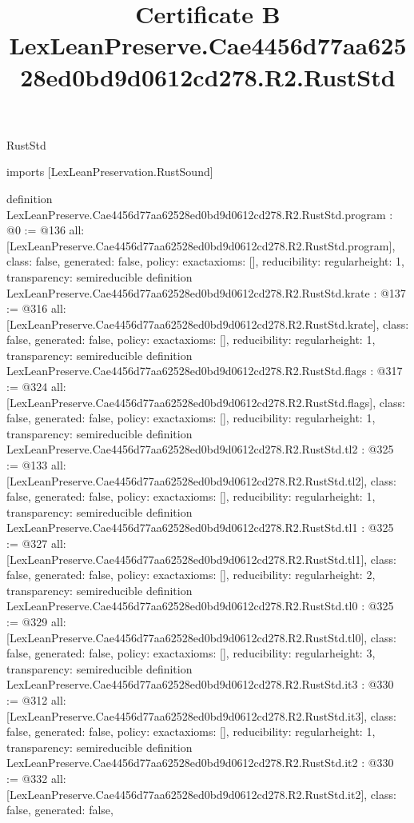 \begin{lexlean}{RustStd}
\title{Certificate B LexLeanPreserve.Cae4456d77aa62528ed0bd9d0612cd278.R2.RustStd}
\begin{coremodule}
imports [LexLeanPreservation.RustSound]

definition LexLeanPreserve.Cae4456d77aa62528ed0bd9d0612cd278.R2.RustStd.program : @0 := @136 {
  all: [LexLeanPreserve.Cae4456d77aa62528ed0bd9d0612cd278.R2.RustStd.program],
  class: false,
  generated: false,
  policy: exact{axioms: []},
  reducibility: regular{height: 1},
  transparency: semireducible
}
definition LexLeanPreserve.Cae4456d77aa62528ed0bd9d0612cd278.R2.RustStd.krate : @137 := @316 {
  all: [LexLeanPreserve.Cae4456d77aa62528ed0bd9d0612cd278.R2.RustStd.krate],
  class: false,
  generated: false,
  policy: exact{axioms: []},
  reducibility: regular{height: 1},
  transparency: semireducible
}
definition LexLeanPreserve.Cae4456d77aa62528ed0bd9d0612cd278.R2.RustStd.flags : @317 := @324 {
  all: [LexLeanPreserve.Cae4456d77aa62528ed0bd9d0612cd278.R2.RustStd.flags],
  class: false,
  generated: false,
  policy: exact{axioms: []},
  reducibility: regular{height: 1},
  transparency: semireducible
}
definition LexLeanPreserve.Cae4456d77aa62528ed0bd9d0612cd278.R2.RustStd.tl2 : @325 := @133 {
  all: [LexLeanPreserve.Cae4456d77aa62528ed0bd9d0612cd278.R2.RustStd.tl2],
  class: false,
  generated: false,
  policy: exact{axioms: []},
  reducibility: regular{height: 1},
  transparency: semireducible
}
definition LexLeanPreserve.Cae4456d77aa62528ed0bd9d0612cd278.R2.RustStd.tl1 : @325 := @327 {
  all: [LexLeanPreserve.Cae4456d77aa62528ed0bd9d0612cd278.R2.RustStd.tl1],
  class: false,
  generated: false,
  policy: exact{axioms: []},
  reducibility: regular{height: 2},
  transparency: semireducible
}
definition LexLeanPreserve.Cae4456d77aa62528ed0bd9d0612cd278.R2.RustStd.tl0 : @325 := @329 {
  all: [LexLeanPreserve.Cae4456d77aa62528ed0bd9d0612cd278.R2.RustStd.tl0],
  class: false,
  generated: false,
  policy: exact{axioms: []},
  reducibility: regular{height: 3},
  transparency: semireducible
}
definition LexLeanPreserve.Cae4456d77aa62528ed0bd9d0612cd278.R2.RustStd.it3 : @330 := @312 {
  all: [LexLeanPreserve.Cae4456d77aa62528ed0bd9d0612cd278.R2.RustStd.it3],
  class: false,
  generated: false,
  policy: exact{axioms: []},
  reducibility: regular{height: 1},
  transparency: semireducible
}
definition LexLeanPreserve.Cae4456d77aa62528ed0bd9d0612cd278.R2.RustStd.it2 : @330 := @332 {
  all: [LexLeanPreserve.Cae4456d77aa62528ed0bd9d0612cd278.R2.RustStd.it2],
  class: false,
  generated: false,
}
\end{coremodule}
\end{lexlean}
